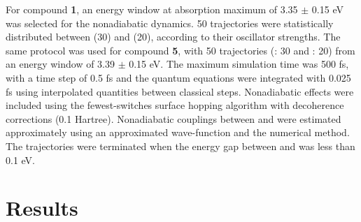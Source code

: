 For compound \textbf{1}, an energy window at absorption maximum of 3.35 $\pm$ 0.15 eV was selected for the nonadiabatic dynamics. 50 trajectories were statistically distributed between \sone{} (30) and \stwo{} (20), according to their oscillator strengths. The same protocol was used for compound \textbf{5}, with 50 trajectories (\sone: 30 and \stwo: 20) from an energy window of 3.39 $\pm$ 0.15 eV. The maximum simulation time was 500 fs, with a time step of 0.5 fs and the quantum equations were integrated with 0.025 fs using interpolated quantities between classical steps. Nonadiabatic effects were included using the fewest-switches surface hopping algorithm with decoherence corrections (0.1 Hartree). Nonadiabatic couplings between \stwo{} and \sone{} were estimated approximately using an approximated wave-function and the numerical method.\cite{Ryabinkin2015} The trajectories were terminated when the energy gap between \sone{} and \szero{} was less than 0.1 eV.

\section{Results}\label{section: NRdecay_Results}

